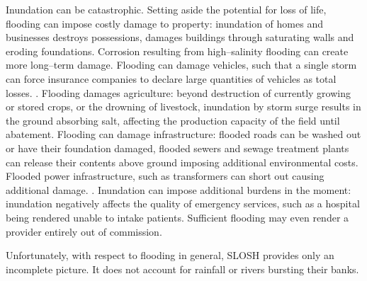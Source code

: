 Inundation can be catastrophic.  Setting aside the potential for loss of life, 
    flooding can impose costly damage to property: inundation of homes and 
    businesses destroys possessions, damages buildings through saturating 
    walls and eroding foundations.  Corrosion resulting from high--salinity
    flooding can create more long--term damage.\needcite  
    Flooding can damage vehicles, such that a single storm can force insurance 
    companies to declare large quantities of vehicles as total losses. 
    \needcite.  Flooding damages agriculture: beyond 
    destruction of currently growing or stored crops, or the drowning of 
    livestock, inundation by storm surge results in the ground absorbing salt, 
    affecting the production capacity of the field until abatement. Flooding can
    damage infrastructure: flooded roads can be washed out or have their 
    foundation damaged, flooded sewers and sewage treatment plants can release 
    their contents above ground imposing additional environmental costs.  
    Flooded power infrastructure, such as transformers can short out causing 
    additional damage. \citep{hutchings2021}.  Inundation can impose additional 
    burdens in the moment:  inundation negatively affects the quality of 
    emergency services, such as a hospital being rendered unable to intake 
    patients.  Sufficient flooding may even render a provider entirely out of 
    commission.

Unfortunately, with respect to flooding in general, SLOSH provides only an 
    incomplete picture.  It does not account for rainfall or rivers bursting
    their banks.


